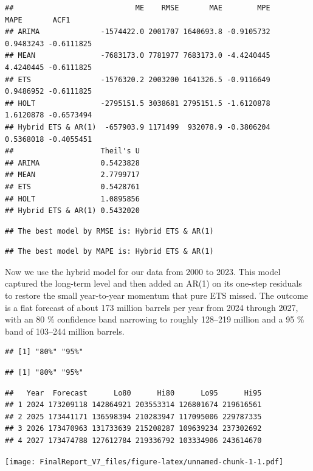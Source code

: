 \documentclass[
]{article}
\begin{document}
\begin{verbatim}
##                            ME    RMSE       MAE        MPE      MAPE       ACF1
## ARIMA              -1574422.0 2001707 1640693.8 -0.9105732 0.9483243 -0.6111825
## MEAN               -7683173.0 7781977 7683173.0 -4.4240445 4.4240445 -0.6111825
## ETS                -1576320.2 2003200 1641326.5 -0.9116649 0.9486952 -0.6111825
## HOLT               -2795151.5 3038681 2795151.5 -1.6120878 1.6120878 -0.6573494
## Hybrid ETS & AR(1)  -657903.9 1171499  932078.9 -0.3806204 0.5368018 -0.4055451
##                    Theil's U
## ARIMA              0.5423828
## MEAN               2.7799717
## ETS                0.5428761
## HOLT               1.0895856
## Hybrid ETS & AR(1) 0.5432020
\end{verbatim}

\begin{verbatim}
## The best model by RMSE is: Hybrid ETS & AR(1)
\end{verbatim}

\begin{verbatim}
## The best model by MAPE is: Hybrid ETS & AR(1)
\end{verbatim}

Now we use the hybrid model for our data from 2000 to 2023. This model
captured the long-term level and then added an AR(1) on its one-step
residuals to restore the small year-to-year momentum that pure ETS
missed. The outcome is a flat forecast of about 173 million barrels per
year from 2024 through 2027, with an 80 \% confidence band narrowing to
roughly 128--219 million and a 95 \% band of 103--244 million barrels.

\begin{verbatim}
## [1] "80%" "95%"
\end{verbatim}

\begin{verbatim}
## [1] "80%" "95%"
\end{verbatim}

\begin{verbatim}
##   Year  Forecast      Lo80      Hi80      Lo95      Hi95
## 1 2024 173209118 142864921 203553314 126801674 219616561
## 2 2025 173441171 136598394 210283947 117095006 229787335
## 3 2026 173470963 131733639 215208287 109639234 237302692
## 4 2027 173474788 127612784 219336792 103334906 243614670
\end{verbatim}

\texttt{[image: FinalReport\_V7\_files/figure-latex/unnamed-chunk-1-1.pdf]}
\end{document}
